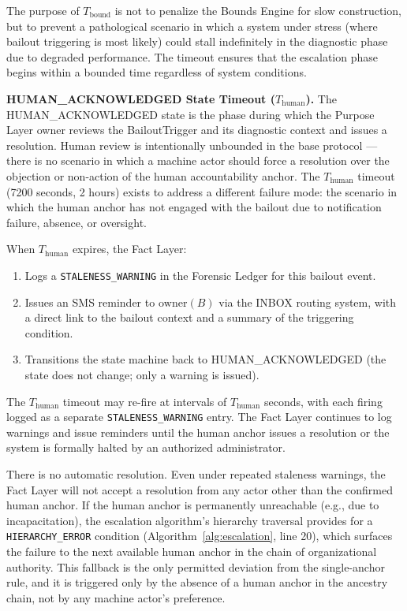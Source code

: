 \documentclass[12pt]{article}
\begin{document}
The purpose of $T_{\text{bound}}$ is not to penalize the Bounds Engine for slow construction, but to prevent a pathological scenario in which a system under stress (where bailout triggering is most likely) could stall indefinitely in the diagnostic phase due to degraded performance. The timeout ensures that the escalation phase begins within a bounded time regardless of system conditions.

\bigskip

\noindent\textbf{HUMAN\_ACKNOWLEDGED State Timeout ($T_{\text{human}}$).} The HUMAN\_ACKNOWLEDGED state is the phase during which the Purpose Layer owner reviews the BailoutTrigger and its diagnostic context and issues a resolution. Human review is intentionally unbounded in the base protocol --- there is no scenario in which a machine actor should force a resolution over the objection or non-action of the human accountability anchor. The $T_{\text{human}}$ timeout (7200 seconds, 2 hours) exists to address a different failure mode: the scenario in which the human anchor has not engaged with the bailout due to notification failure, absence, or oversight.

When $T_{\text{human}}$ expires, the Fact Layer:
\begin{enumerate}\setlength\itemsep{0.25em}
\item Logs a \texttt{STALENESS\_WARNING} in the Forensic Ledger for this bailout event.
\item Issues an SMS reminder to $\text{owner}(B)$ via the INBOX routing system, with a direct link to the bailout context and a summary of the triggering condition.
\item Transitions the state machine back to HUMAN\_ACKNOWLEDGED (the state does not change; only a warning is issued).
\end{enumerate}

The $T_{\text{human}}$ timeout may re-fire at intervals of $T_{\text{human}}$ seconds, with each firing logged as a separate \texttt{STALENESS\_WARNING} entry. The Fact Layer continues to log warnings and issue reminders until the human anchor issues a resolution or the system is formally halted by an authorized administrator.

There is no automatic resolution. Even under repeated staleness warnings, the Fact Layer will not accept a resolution from any actor other than the confirmed human anchor. If the human anchor is permanently unreachable (e.g., due to incapacitation), the escalation algorithm's hierarchy traversal provides for a \texttt{HIERARCHY\_ERROR} condition (Algorithm~\ref{alg:escalation}, line 20), which surfaces the failure to the next available human anchor in the chain of organizational authority. This fallback is the only permitted deviation from the single-anchor rule, and it is triggered only by the absence of a human anchor in the ancestry chain, not by any machine actor's preference.
\end{document}
